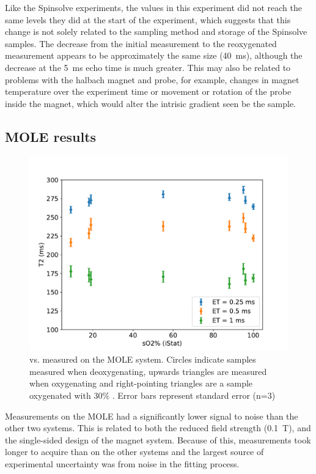 Like the Spinsolve experiments, the \Ttwo values in this experiment did not reach the same levels they did at the start of the experiment, which suggests that this change is not solely related to the sampling method and storage of the Spinsolve samples.
The decrease from the initial \Ttwo measurement to the reoxygenated measurement appears to be approximately the same size (\SI{40}{ms}), although the decrease at the \SI{5}{ms} echo time is much greater.
This may also be related to problems with the halbach magnet and probe, for example, changes in magnet temperature over the experiment time or movement or rotation of the probe inside the magnet, which would alter the intrisic gradient seen be the sample.


\subsection{MOLE results}
\begin{figure}[h]
\centering
\includegraphics[width=\textwidth]{figures/stoppedflow/moleT2SO2.pdf}
\caption[Stopped flow \Ttwo vs. \SOtwo measured on the MOLE system]{\Ttwo vs. \SOtwo measured on the MOLE system. Circles indicate samples measured when deoxygenating, upwards triangles are measured when oxygenating and right-pointing triangles are a sample oxygenated with 30\% \Otwo. Error bars represent standard error (n=3)}
\label{fig:sf-moleT2SO2}
\end{figure}
%
Measurements on the MOLE had a significantly lower signal to noise than the other two systems.
This is related to both the reduced field strength (\SI{0.1}{T}), and the single-sided design of the magnet system.
Because of this, measurements took longer to acquire than on the other systems and the largest source of experimental uncertainty was from noise in the fitting process.

